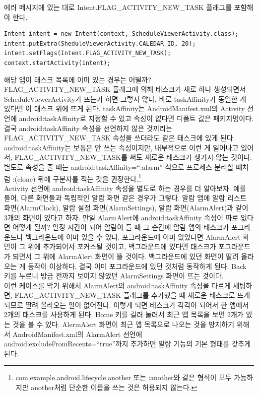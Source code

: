 에러 메시지에 있는 대로 Intent.FLAG\_ACTIVITY\_NEW\_TASK 플래그를 포함해야 한다.
\begin{lstlisting}[frame=single]
Intent intent = new Intent(context, ScheduleViewerActivity.class);
intent.putExtra(SheduleViewerActivity.CALEDAR_ID, 20);
intent.setFlags(Intent.FLAG_ACTIVITY_NEW_TASK);
context.startActivity(intent);
\end{lstlisting}

해당 앱이 태스크 목록에 이미 있는 경우는 어떨까? FLAG\_ACTIVITY\_NEW\_TASK 플래그에 의해 태스크가 새로 하나 생성되면서 ScheduleViewerActivity가 뜨는가 하면 그렇지 않다. 바로 taskAffinity가 동일한 게 있다면 이 태스크 위에 뜨게 된다. 
taskAffinity는 AndroidManifest.xml의 Activity 선언에 android:taskAffinity로 지정할 수 있고 속성이 없다면 디폴트 값은 패키지명이다.
결국 android:taskAffinity 속성을 선언하지 않은 것끼리는 FLAG\_ACTIVITY\_NEW\_TASK 속성을 쓰더라도 같은 태스크에 있게 된다.
android:taskAffinity는 보통은 안 쓰는 속성이지만, 내부적으로 이런 게 일어나고 있어서, FLAG\_ACTIVITY\_NEW\_TASK를 써도 새로운 태스크가 생기지 않는 것이다.
별도로 속성을 줄 때는 android:taskAffinity=``:alarm'' 식으로 프로세스 분리할 때처럼 :(clone) 뒤에 구분자를 적는 것을 권장한다.\footnote{com.example.android.lifecycle.another 또는 :another와 같은 형식이 모두 가능하지만  another처럼 단순한 이름을 쓰는 것은 허용되지 않는다.}\\

Activity 선언에 android:taskAffinity 속성을 별도로 하는 경우를 더 알아보자. 예를 들어, 다른 화면들과 독립적인 알람 화면 같은 경우가 그렇다. 
알람 앱에 알람 리스트 화면(AlarmClock), 알람 설정 화면(AlarmSettings), 알람 화면(AlarmAlert)과 같이 3개의 화면이 있다고 하자. 
만일 AlarmAlert에 android:taskAffinity 속성이 따로 없다면 어떻게 될까?
일정 시간이 되어 알람이 들 때 그 순간에 알람 앱의 태스크가 포그라운드나 백그라운드에 이미 있을 수 있다. 
포그라운드에 이미 있었다면 AlarmAlert 화면이 그 위에 추가되어서 포커스될 것이고, 백그라운드에 있다면 태스크가 포그라운드가 되면서 그 위에 AlarmAlert 화면이 뜰 것이다.  
백그라운드에 있던 화면이 딸려 올라오는 게 동작이 이상하다. 결국 이미 포그라운드에 있던 것처럼 동작하게 된다. Back 키를 누르니 방금 전까지 보이지 않았던 AlarmSettings 화면이 뜨는 것이다.\\

이런 케이스를 막기 위해서 AlarmAlert의 android:taskAffinity 속성을 다르게 세팅하면, FLAG\_ACTIVITY\_NEW\_TASK 플래그를 추가했을 때 새로운 태스크로 뜨게 되므로 딸려 올라오는 일이 없어진다. 이렇게 되면 태스크가 각각이 되어서 한 앱에서 2개의 태스크를 사용하게 된다.
Home 키를 길러 눌러서 최근 앱 목록을 보면 2개가 있는 것을 볼 수 있다. AlermAlert 화면이 최근 앱 목록으로 나오는 것을 방지하기 위해서 AndroidManifest.xml의 AlarmAlert 선언에 android:excludeFromRecents=``true''까지 추가하면 알람 기능의 기본 형태를 갖추게 된다.


